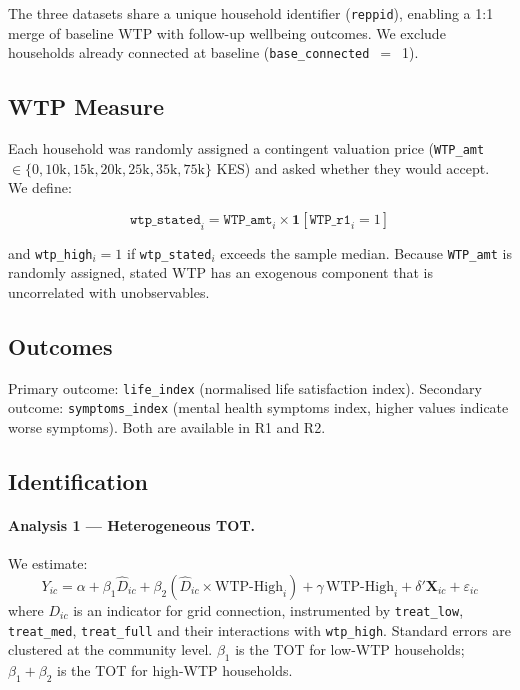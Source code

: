 \documentclass[letter,12pt]{article}
\begin{document}
The three datasets share a unique household identifier (\texttt{reppid}),
enabling a 1:1 merge of baseline WTP with follow-up wellbeing outcomes.
We exclude households already connected at baseline
(\texttt{base\_connected}~$=$~1).

\subsection{WTP Measure}

Each household was randomly assigned a contingent valuation price
(\texttt{WTP\_amt} $\in \{0, 10\text{k}, 15\text{k}, 20\text{k}, 25\text{k},
35\text{k}, 75\text{k}\}$ KES) and asked whether they would accept. We
define:

\begin{equation}
  \texttt{wtp\_stated}_i =
    \texttt{WTP\_amt}_i \times \mathbf{1}[\texttt{WTP\_r1}_i = 1]
\end{equation}

and \texttt{wtp\_high}$_i = 1$ if \texttt{wtp\_stated}$_i$ exceeds the
sample median. Because \texttt{WTP\_amt} is randomly assigned, stated WTP
has an exogenous component that is uncorrelated with unobservables.

\subsection{Outcomes}

Primary outcome: \texttt{life\_index} (normalised life satisfaction index).
Secondary outcome: \texttt{symptoms\_index} (mental health symptoms index,
higher values indicate worse symptoms). Both are available in R1 and R2.

\subsection{Identification}

\paragraph{Analysis 1 --- Heterogeneous TOT.}
We estimate:
\begin{equation}
  Y_{ic} = \alpha + \beta_1 \widehat{D}_{ic} + \beta_2 (\widehat{D}_{ic}
    \times \text{WTP-High}_{i}) + \gamma \, \text{WTP-High}_{i}
    + \delta' \mathbf{X}_{ic} + \varepsilon_{ic}
\end{equation}
where $D_{ic}$ is an indicator for grid connection, instrumented by
\texttt{treat\_low}, \texttt{treat\_med}, \texttt{treat\_full} and their
interactions with \texttt{wtp\_high}. Standard errors are clustered at the
community level. $\beta_1$ is the TOT for low-WTP households;
$\beta_1 + \beta_2$ is the TOT for high-WTP households.
\end{document}
